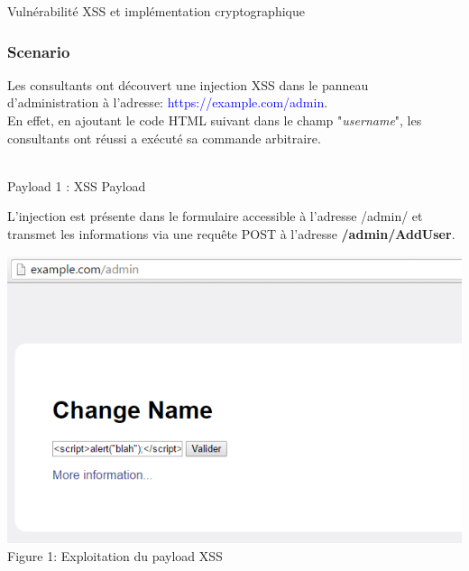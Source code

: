 \documentclass[twoside,a4paper,12pt,titlepage]{book}
\begin{document}
\begin{LongFlagConsole}{Vulnérabilité XSS et implémentation cryptographique}
{{\subsubsection*{Scenario}
Les consultants ont découvert une injection XSS dans le panneau d'administration à l'adresse: \textcolor{blue}{https://example.com/admin}.\\
En effet, en ajoutant le code HTML suivant dans le champ "\textit{username}", les consultants ont réussi a exécuté sa commande arbitraire.
\begin{center}\usebox\SchematicsBox \\
Payload 1 : XSS Payload \end{center}
L'injection est présente dans le formulaire accessible à l'adresse /admin/ et transmet les informations via une requête POST à l'adresse \textbf{/admin/AddUser}.\\
\begin{center}\includegraphics[width=.9\textwidth]{audit_proof_1.png}\\Figure 1: Exploitation du payload XSS\end{center}%
}}\\[1cm]
\begin{lrbox}{\SchematicsBox}
\end{lrbox}
\end{LongFlagConsole}
\end{document}
